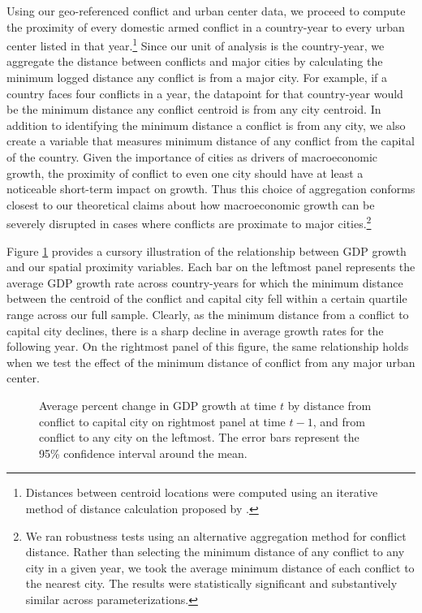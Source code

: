 Using our geo-referenced conflict and urban center data, we proceed to compute the proximity of every domestic armed conflict in a country-year to every urban center listed in that year.\footnote{Distances between centroid locations were computed using an iterative method of distance calculation proposed by \citet{vincenty:1975}.} Since our unit of analysis is the country-year, we aggregate the distance between conflicts and major cities by calculating the minimum logged distance any conflict is from a major city. For example, if a country faces four conflicts in a year, the datapoint for that country-year would be the minimum distance any conflict centroid is from any city centroid. In addition to identifying the minimum distance a conflict is from any city, we also create a variable that measures minimum distance of any conflict from the capital of the country. Given the importance of cities as drivers of macroeconomic growth, the proximity of conflict to even one city should have at least a noticeable short-term impact on growth. Thus this choice of aggregation conforms closest to our theoretical claims about how macroeconomic growth can be severely disrupted in cases where conflicts are proximate to major cities.\footnote{We ran robustness tests using an alternative aggregation method for conflict distance. Rather than selecting the minimum distance of any conflict to any city in a given year, we took the average minimum distance of each conflict to the nearest city. The results were statistically significant and substantively similar across parameterizations.}

Figure \ref{fig:distGdp} provides a cursory illustration of the relationship between GDP growth and our spatial proximity variables. Each bar on the leftmost panel represents the average GDP growth rate across country-years for which the minimum distance between the centroid of the conflict and capital city fell within a certain quartile range across our full sample. Clearly, as the minimum distance from a conflict to capital city declines, there is a sharp decline in average growth rates for the following year. On the rightmost panel of this figure, the same relationship holds when we test the effect of the minimum distance of conflict from any major urban center. 

\begin{figure}
	\centering
	\resizebox{.8\textwidth}{!}{}
	\caption{Average percent change in GDP growth at time $t$ by distance from conflict to capital city on rightmost panel at time $t-1$, and from conflict to any city on the leftmost. The error bars represent the 95\% confidence interval around the mean.}
	\label{fig:distGdp}
\end{figure}


